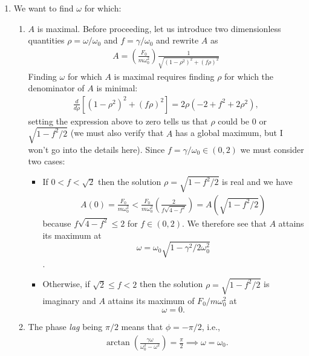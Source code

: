 \documentclass{article}
\theoremstyle{definition}
\newcommand{\f}[2]{\frac{#1}{#2}}
\newcommand{\lp}{\left(}
\newcommand{\rp}{\right)}
\newcommand{\lb}{\left[}
\newcommand{\rb}{\right]}
\begin{document}
\begin{enumerate}[label= \alph*)]
	\item We want to find $\omega$ for which:
	
	\begin{enumerate}[label=\roman*)]
		\item $A$ is maximal. Before proceeding, let us introduce two dimensionless quantities $\rho = \omega/\omega_0$ and $f = \gamma/\omega_0$ and rewrite $A$ as 
		\begin{align*}
		A =  \lp \f{F_0}{m \omega_0^2}\rp \f{1}{\sqrt{(1-\rho^2)^2 + (f\rho)^2}}
		\end{align*}
		Finding $\omega$ for which $A$ is maximal requires finding $\rho$ for which the denominator of $A$ is minimal:
		\begin{align*}
		\f{d}{d\rho}\lb (1-\rho^2)^2 + (f\rho)^2 \rb = 2\rho(-2 + f^2 + 2\rho^2),
		\end{align*}
		setting the expression above to zero tells us that $\rho$ could be $0$ or $\sqrt{1-f^2/2}$ (we must also verify that $A$ has a global maximum, but I won't go into the details here). Since $f = \gamma/\omega_0 \in (0,2)$ we must consider two cases:
		\begin{itemize}
			\item If ${0 < f < \sqrt{2}}$ then the solution $\rho = \sqrt{1-f^2/2}$ is real and we have 
			\begin{align*}
			A(0)= \f{F_0}{m\omega_0^2} <  \f{F_0}{m\omega_0^2} \lp \f{2}{f\sqrt{4-f^2}}\rp  = A\lp \sqrt{1-f^2/2}\rp
			\end{align*}
			because $f\sqrt{4-f^2} \leq 2$ for $f\in (0,2)$. We therefore see that $A$ attains its maximum at $$\omega = \omega_0 \sqrt{1- \gamma^2/2\omega_0^2}$$.
			
			
			
			\item Otherwise, if ${\sqrt{2} \leq f < 2}$ then the solution $\rho = \sqrt{1-f^2/2}$ is imaginary and $A$ attains its maximum of $F_0/m\omega_0^2$ at $$\omega = 0.$$
		\end{itemize}
	
	
	
	\item The phase \textit{lag} being $\pi/2$ means that $\phi = -\pi/2$, i.e.,
	\begin{align*}
	\arctan\lp \f{\gamma \omega}{\omega_0^2 - \omega^2} \rp = \f{\pi}{2} \implies \omega = \omega_0.
	\end{align*}
	

\end{enumerate}
\end{enumerate}
\end{document}
